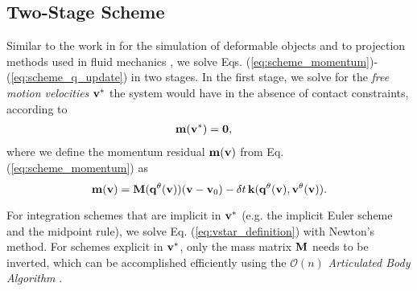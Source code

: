 
\subsection{Two-Stage Scheme}
Similar to the work in \cite{bib:duriez2005realistic} for the simulation of
deformable objects and to projection methods used in fluid mechanics
\cite{bib::bell1991efficient}, we solve Eqs.
(\ref{eq:scheme_momentum})-(\ref{eq:scheme_q_update}) in two stages. In the
first stage, we solve for the \emph{free motion velocities} ${\mathbf{v}}^*$ the
system would have in the absence of contact constraints, according to
\begin{align}
	\mf{m}(\mf{v}^*) &= \mf{0},
	\label{eq:vstar_definition}
\end{align}
where we define the momentum residual ${\mathbf{m}}({\mathbf{v}})$ from Eq.
(\ref{eq:scheme_momentum}) as
\begin{equation}
	\mf{m}(\mf{v}) =
	\mf{M}(\mf{q}^{\theta}(\mf{v}))(\mf{v}-\mf{v}_0) -
	\delta t\,\mf{k}(\mf{q}^{\theta}(\mf{v}), \mf{v}^{\theta}(\mf{v})).
	\label{eq:m_definition}
\end{equation}

For integration schemes that are implicit in ${\mathbf{v}}^*$ (e.g. the implicit Euler
scheme and the midpoint rule), we solve Eq. (\ref{eq:vstar_definition}) with
Newton's method. For schemes explicit in ${\mathbf{v}}^*$, only the mass matrix
${\mathbf{M}}$ needs to be inverted, which can be accomplished efficiently using the
$\mathcal{O}(n)$ \emph{Articulated Body Algorithm}
\cite{bib:featherstone2008_rigid_body_dynamics_algorithms}.

